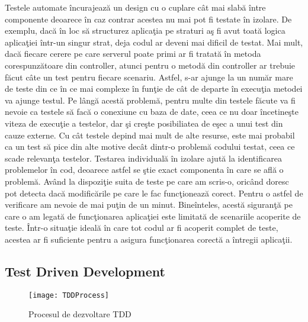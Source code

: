 \documentclass[a4paper,12pt]{report}
\begin{document}
Testele automate \^incurajeaz\u a un design cu o cuplare c\^at mai slab\u a \^intre componente deoarece \^in
caz contrar acestea nu mai pot fi testate \^in izolare. De exemplu, dac\u a \^in loc s\u a structurez aplica\c tia pe 
straturi a\c s fi avut toat\u a logica aplica\c tiei \^intr-un singur strat, deja codul ar deveni mai dificil de testat.
Mai mult, dac\u a fiecare cerere pe care serverul poate primi ar fi tratat\u a \^in metoda corespunz\u atoare din controller,
atunci pentru o metod\u a din controller ar trebuie f\u acut c\^ate un test pentru fiecare scenariu.
Astfel, s-ar ajunge la un num\u ar mare de teste din ce \^in ce mai complexe \^in fun\c tie de c\^at de departe \^in execu\c tia metodei 
va ajunge testul. Pe l\^ang\u a acest\u a problem\u a, pentru multe din testele f\u acute va fi nevoie ca testele s\u a fac\u a 
o conexiune cu baza de date, ceea ce nu doar \^incetine\c ste viteza de execu\c tie a testelor, dar \c si cre\c ste posibiliatea de 
e\c sec a unui test din cauze externe. Cu c\^at testele depind mai mult de alte resurse, este mai probabil ca un test s\u a pice 
din alte motive dec\^at dintr-o problem\u a codului testat, ceea ce scade relevan\c ta testelor. Testarea individual\u a \^in izolare ajut\u a 
la identificarea problemelor \^in cod, deoarece astfel se \c stie exact componenta \^in care se afl\u a o problem\u a.
Av\^and la dispozi\c tie suita de teste pe care am scris-o, oric\^and doresc pot detecta dac\u a modific\u arile 
pe care le fac func\c tioneaz\u a corect. Pentru o astfel de verificare am nevoie de mai pu\c tin de un minut.
Bine\^inteles, acest\u a siguran\c t\u a pe care o am legat\u a de func\c tionarea aplica\c tiei este limitat\u a
de scenariile acoperite de teste. \^Intr-o situa\c tie ideal\u a \^in care tot codul ar fi acoperit complet de teste,
acestea ar fi suficiente pentru a asigura func\c tionarea corect\u a a \^intregii aplica\c tii. 


\subsection{Test Driven Development}


\begin{figure}[ht]
	\caption{Procesul de dezvoltare TDD}
	\texttt{[image: TDDProcess]}
	\label{fig:TDDProcess}
\end{figure}
\end{document}
